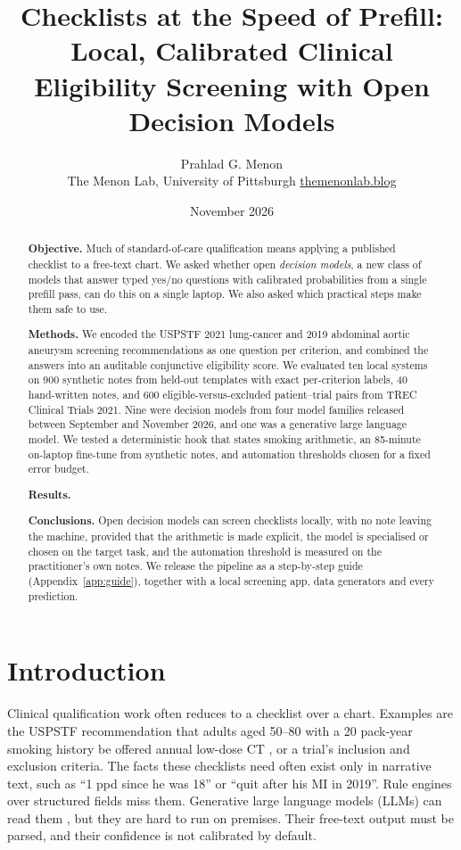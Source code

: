 \documentclass[11pt]{article}
\title{Checklists at the Speed of Prefill:\\[4pt]\large Local, Calibrated Clinical Eligibility Screening with Open Decision Models}
\author{Prahlad G. Menon\\\small The Menon Lab, University of Pittsburgh \quad \href{https://themenonlab.blog}{themenonlab.blog}}
\date{November 2026}
\begin{document}
\maketitle

\begin{abstract}
\noindent\textbf{Objective.}
Much of standard-of-care qualification means applying a published checklist to a free-text chart.
We asked whether open \emph{decision models}, a new class of models that answer typed yes/no questions with calibrated probabilities from a single prefill pass, can do this on a single laptop. We also asked which practical steps make them safe to use.

\noindent\textbf{Methods.}
We encoded the USPSTF 2021 lung-cancer and 2019 abdominal aortic aneurysm screening recommendations as one question per criterion, and combined the answers into an auditable conjunctive eligibility score.
We evaluated ten local systems on 900 synthetic notes from held-out templates with exact per-criterion labels, 40 hand-written notes, and 600 eligible-versus-excluded patient--trial pairs from TREC Clinical Trials 2021. Nine were decision models from four model families released between September and November 2026, and one was a generative large language model.
We tested a deterministic hook that states smoking arithmetic, an 85-minute on-laptop fine-tune from synthetic notes, and automation thresholds chosen for a fixed error budget.

\noindent\textbf{Results.}
\AbstractResults{}

\noindent\textbf{Conclusions.}
Open decision models can screen checklists locally, with no note leaving the machine, provided that the arithmetic is made explicit, the model is specialised or chosen on the target task, and the automation threshold is measured on the practitioner's own notes.
We release the pipeline as a step-by-step guide (Appendix~\ref{app:guide}), together with a local screening app, data generators and every prediction.
\end{abstract}

\section{Introduction}
\label{sec:intro}
Clinical qualification work often reduces to a checklist over a chart.
Examples are the USPSTF recommendation that adults aged 50--80 with a 20 pack-year smoking history be offered annual low-dose CT \citep{krist2021lung}, or a trial's inclusion and exclusion criteria.
The facts these checklists need often exist only in narrative text, such as ``1 ppd since he was 18'' or ``quit after his MI in 2019''.
Rule engines over structured fields miss them.
Generative large language models (LLMs) can read them \citep{jin2024trialgpt,wornow2024zeroshot}, but they are hard to run on premises.
Their free-text output must be parsed, and their confidence is not calibrated by default.
\end{document}
